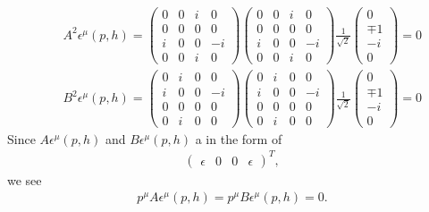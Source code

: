 \documentclass[11pt]{article}
\def\eps{\epsilon}
\begin{document}
\section{ }
\begin{eqnarray}
    && A^2 \eps^\mu(p,h) = 
    \begin{pmatrix}
        0 & 0 & i & 0\\ 
        0 & 0 & 0 & 0 \\
        i & 0 & 0 & -i \\
        0 & 0 & i & 0
    \end{pmatrix} 
    \begin{pmatrix}
        0 & 0 & i & 0\\ 
        0 & 0 & 0 & 0 \\
        i & 0 & 0 & -i \\
        0 & 0 & i & 0
    \end{pmatrix} 
    \frac{1}{\sqrt 2}
    \begin{pmatrix}
        0 \\ \mp 1 \\ -i \\ 0
    \end{pmatrix}
    =0
\end{eqnarray}
\begin{eqnarray}
    && B^2 \eps^\mu(p,h) = 
    \begin{pmatrix}
        0 & i & 0 & 0 \\
        i & 0 & 0 & -i \\
        0 & 0 & 0 & 0 \\
        0 & i & 0 & 0 
    \end{pmatrix}
    \begin{pmatrix}
        0 & i & 0 & 0 \\
        i & 0 & 0 & -i \\
        0 & 0 & 0 & 0 \\
        0 & i & 0 & 0 
    \end{pmatrix}
    \frac{1}{\sqrt 2}
    \begin{pmatrix}
        0 \\ \mp 1 \\ -i \\ 0
    \end{pmatrix}
    =0
\end{eqnarray}
Since $A \eps^\mu(p,h)$ and $B \eps^\mu(p,h)$ a in the form of
\begin{eqnarray}
    \begin{pmatrix}
        \eps & 0 & 0 & \eps 
    \end{pmatrix}^T,
\end{eqnarray}
we see 
\begin{eqnarray}
    p^\mu A \eps^\mu(p,h) = p^\mu B \eps^\mu(p,h) = 0.
\end{eqnarray}
\end{document}
